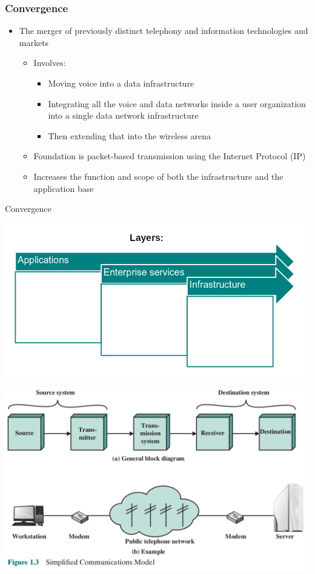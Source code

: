 \documentclass[pdflatex,compress]{beamer}
\begin{document}
\begin{frame}
	\frametitle{Convergence}
	\begin{itemize}
		\item The merger of previously distinct telephony and information technologies and markets
		\begin{itemize}
			\item Involves:
			\begin{itemize}
				\item Moving voice into a data infrastructure
				\item Integrating all the voice and data networks inside a user organization into a single data network infrastructure
				\item Then extending that into the wireless arena
			\end{itemize}
			\item Foundation is packet-based transmission using the Internet Protocol (IP)
			\item Increases the function and scope of both the infrastructure and the application base
		\end{itemize}
	\end{itemize}
\end{frame}

\begin{frame}{Convergence}
	\begin{center}
		\includegraphics[width=\linewidth]{img/img05}
	\end{center}
\end{frame}

\begin{frame}
	\begin{center}
		\includegraphics[width=\linewidth]{img/img06}
	\end{center}
\end{frame}
\end{document}
